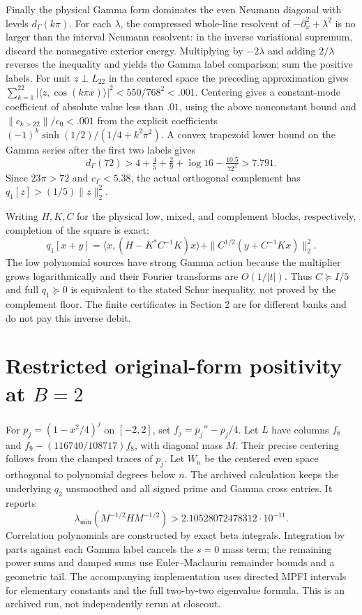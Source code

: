 \documentclass[11pt]{article}
\newcommand{\ip}[2]{\langle #1,#2\rangle}
\begin{document}
Finally the physical Gamma form dominates the even Neumann diagonal with levels $d_\Gamma(k\pi)$. For each $\lambda$, the compressed whole-line resolvent of $-\partial_x^2+\lambda^2$ is no larger than the interval Neumann resolvent: in the inverse variational supremum, discard the nonnegative exterior energy. Multiplying by $-2\lambda$ and adding $2/\lambda$ reverses the inequality and yields the Gamma label comparison; sum the positive labels. For unit $z\perp L_{22}$ in the centered space the preceding approximation gives $\sum_{k=1}^{22}|\ip{z}{\cos(k\pi x)}|^2<550/768^2<.001$. Centering gives a constant-mode coefficient of absolute value less than $.01$, using the above nonconstant bound and $\|c_{k>22}\|/c_0<.001$ from the explicit coefficients $(-1)^k\sinh(1/2)/(1/4+k^2\pi^2)$. A convex trapezoid lower bound on the Gamma series after the first two labels gives
\[
 d_\Gamma(72)>4+\tfrac45+\tfrac29+\log16-\tfrac{10.5}{72^2}>7.791.
\]
Since $23\pi>72$ and $c_\Gamma<5.38$, the actual orthogonal complement has $q_1[z]>(1/5)\|z\|_2^2$.

Writing $H,K,C$ for the physical low, mixed, and complement blocks, respectively, completion of the square is exact:
\[
 q_1[x+y]=\ip{x}{(H-K^*C^{-1}K)x}
       +\|C^{1/2}(y+C^{-1}Kx)\|_2^2.
\]
The low polynomial sources have strong Gamma action because the multiplier grows logarithmically and their Fourier transforms are $O(1/|t|)$. Thus $C\succeq I/5$ and full $q_1\succeq0$ is equivalent to the stated Schur inequality, not proved by the complement floor. The finite certificates in Section 2 are for different banks and do not pay this inverse debit.

\section[Restricted original form at B=2]{Restricted original-form positivity at $B=2$}
For $p_j=(1-x^2/4)^j$ on $[-2,2]$, set $f_j=p_j''-p_j/4$. Let $L$ have columns $f_8$ and $f_9-(116740/108717)f_8$, with diagonal mass $M$. Their precise centering follows from the clamped traces of $p_j$. Let $W_n$ be the centered even space orthogonal to polynomial degrees below $n$. The archived calculation keeps the underlying $q_2$ unsmoothed and all signed prime and Gamma cross entries. It reports
\[
 \lambda_{\min}(M^{-1/2}H M^{-1/2})>2.10528072478312\cdot10^{-11}.
\]
Correlation polynomials are constructed by exact beta integrals. Integration by parts against each Gamma label cancels the $s=0$ mass term; the remaining power sums and damped sums use Euler--Maclaurin remainder bounds \cite{dlmfsum} and a geometric tail. The accompanying implementation uses directed MPFI intervals for elementary constants and the full two-by-two eigenvalue formula. This is an archived run, not independently rerun at closeout.
\end{document}

